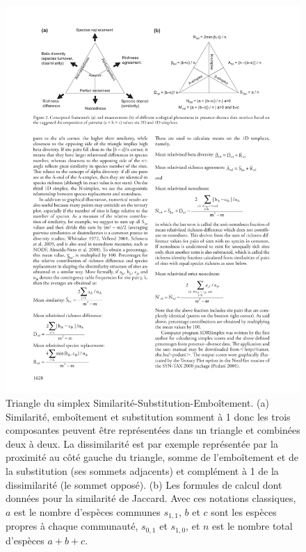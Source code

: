 \documentclass[
  11pt,
  french,
  a4paper,
  extrafontsizes,onecolumn,openright
  ]{memoir}
\begin{document}
\begin{figure}

{\centering \includegraphics[width=1\linewidth]{images/Podani2011} 

}

\caption{Triangle du simplex Similarité-Substitution-Emboîtement. (a) Similarité, emboîtement et substitution somment à 1 donc les trois composantes peuvent être représentées dans un triangle et combinées deux à deux. La dissimilarité est par exemple représentée par la proximité au côté gauche du triangle, somme de l'emboîtement et de la substitution (ses sommets adjacents) et complément à 1 de la dissimilarité (le sommet opposé). (b) Les formules de calcul dont données pour la similarité de Jaccard. Avec ces notations classiques, \(a\) est le nombre d'espèces communes \(s_{1,1}\), \(b\) et \(c\) sont les espèces propres à chaque communauté, \(s_{0,1}\) et \(s_{1,0}\), et \(n\) est le nombre total d'espèces \(a+b+c\).}\label{fig:Podani2011}
\end{figure}
\end{document}
